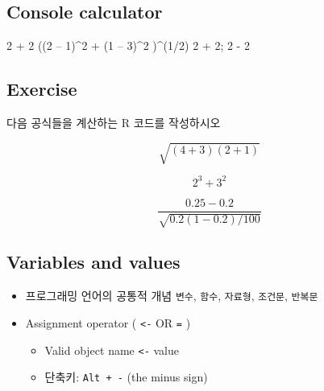 \documentclass[
]{book}
\newenvironment{Shaded}{\begin{snugshade}}{\end{snugshade}}
\newcommand{\DecValTok}[1]{\textcolor[rgb]{0.00,0.00,0.81}{#1}}
\newcommand{\NormalTok}[1]{#1}
\newcommand{\SpecialCharTok}[1]{\textcolor[rgb]{0.00,0.00,0.00}{#1}}
\providecommand{\tightlist}{%
  \setlength{\itemsep}{0pt}\setlength{\parskip}{0pt}}
\begin{document}
\hypertarget{console-calculator}{%
\subsection{Console calculator}\label{console-calculator}}

\begin{Shaded}
\begin{Highlighting}[]
\DecValTok{2} \SpecialCharTok{+} \DecValTok{2}
\NormalTok{((}\DecValTok{2}\NormalTok{ – }\DecValTok{1}\NormalTok{)}\SpecialCharTok{\^{}}\DecValTok{2} \SpecialCharTok{+}\NormalTok{ (}\DecValTok{1}\NormalTok{ – }\DecValTok{3}\NormalTok{)}\SpecialCharTok{\^{}}\DecValTok{2}\NormalTok{ )}\SpecialCharTok{\^{}}\NormalTok{(}\DecValTok{1}\SpecialCharTok{/}\DecValTok{2}\NormalTok{)}
\DecValTok{2} \SpecialCharTok{+} \DecValTok{2}\NormalTok{; }\DecValTok{2} \SpecialCharTok{{-}} \DecValTok{2}
\end{Highlighting}
\end{Shaded}

\hypertarget{exercise-1}{%
\subsection{Exercise}\label{exercise-1}}

다음 공식들을 계산하는 R 코드를 작성하시오

\[ \sqrt{(4+3)(2+1)} \]

\[ 2^3 + 3^2 \]

\[ \frac{0.25 - 0.2}{\sqrt{0.2 (1-0.2)/100}}\]

\hypertarget{variables-and-values}{%
\subsection{Variables and values}\label{variables-and-values}}

\begin{itemize}
\tightlist
\item
  프로그래밍 언어의 공통적 개념 \texttt{변수}, \texttt{함수}, \texttt{자료형}, \texttt{조건문}, \texttt{반복문}\\
\item
  Assignment operator ( \texttt{\textless{}-} OR \texttt{=} )

  \begin{itemize}
  \tightlist
  \item
    Valid object name \texttt{\textless{}-} value
  \item
    단축키: \texttt{Alt\ +\ -} (the minus sign)
  \end{itemize}
\end{itemize}
\end{document}
